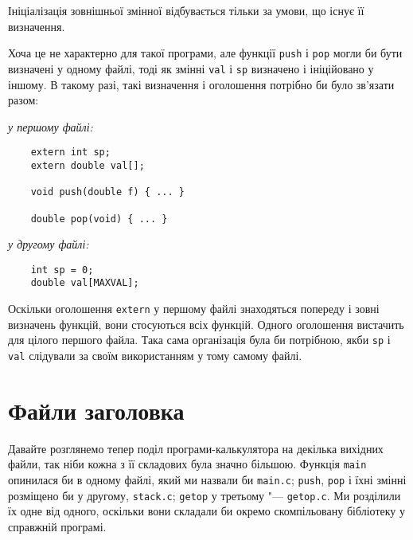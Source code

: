 \documentclass[a4paper,12pt]{book}
\begin{document}
  Ініціалізація зовнішньої змінної відбувається тільки за умови, що існує її визначення.

  Хоча це не характерно для такої програми, але функції \texttt{push} і \texttt{pop} могли
  би бути визначені у одному файлі, тоді як змінні \texttt{val} і \texttt{sp} визначено
  і ініційовано у іншому. В такому разі, такі визначення і оголошення потрібно би було
  зв'язати разом:

\* \* \textit{у першому файлі:}
  \begin{verbatim}
    extern int sp;
    extern double val[];

    void push(double f) { ... }

    double pop(void) { ... }
  \end{verbatim}

\* \* \textit{у другому файлі:}
  \begin{verbatim}
    int sp = 0;
    double val[MAXVAL];
  \end{verbatim}

  Оскільки оголошення \texttt{extern} у першому файлі знаходяться попереду і зовні
  визначень функцій, вони стосуються всіх функцій. Одного оголошення вистачить для цілого
  першого файла. Така сама організація була би потрібною, якби \texttt{sp} і \texttt{val}
  слідували за своїм використанням у тому самому файлі.

\section{Файли заголовка}


  Давайте розглянемо тепер поділ програми-калькулятора на декілька вихідних файли, так
  ніби кожна з її складових була значно більшою. Функція \texttt{main} опинилася би в
  одному файлі, який ми назвали би \texttt{main.c}; \texttt{push}, \texttt{pop} і їхні
  змінні розміщено би у другому, \texttt{stack.c}; \texttt{getop} у третьому "---
  \texttt{getop.c}. Ми розділили їх одне від одного, оскільки вони складали би окремо
  скомпільовану бібліотеку у справжній програмі.
\end{document}
